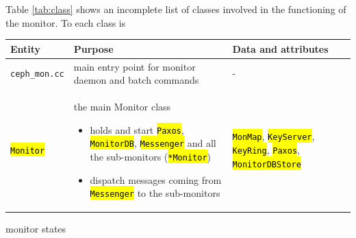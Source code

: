 \documentclass{article}
\newcommand{\hlc}[2][yellow]{\sethlcolor{#1}\hl{#2}}
\newcommand{\class}[1]{\xspace{\small\hlc[light-gray]{\texttt{#1}}}\xspace}
\begin{document}
Table \ref{tab:class} shows an incomplete list of classes involved in the functioning of the monitor.
To each class is

\begin{center}
	\begin{tabular}{l|p{6cm}|p{5cm}}
		Entity & Purpose & Data and attributes \\ \hline
		\texttt{ceph\_mon.cc} & main entry point for monitor daemon and batch commands & - \\
		\class{Monitor} & 
		
		the main Monitor class 
		\begin{itemize}
		\item holds and start \class{Paxos}, 
		                 \class{MonitorDB}, \class{Messenger} and all the sub-monitors
		                 (\class{*Monitor}) 
        \item dispatch messages coming from \class{Messenger} to the sub-monitors 
        \end{itemize}		                 
		                 
		                 & 
		                \class{MonMap}, \class{KeyServer}, \class{KeyRing}, \class{Paxos},
		                \class{MonitorDBStore}\\
	\end{tabular}
	\label{tab:class}
\end{center}


monitor states
\end{document}
